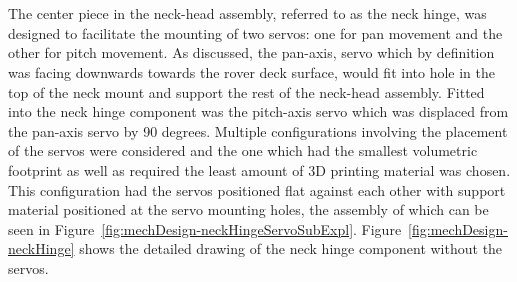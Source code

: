       \\\\
        The center piece in the neck-head assembly, referred to as the neck hinge, was designed to facilitate the mounting of two servos: one for pan movement and the other for pitch movement. As discussed, the pan-axis, servo which by definition was facing downwards towards the rover deck surface, would fit into hole in the top of the neck mount and support the rest of the neck-head assembly. Fitted into the neck hinge component was the pitch-axis servo which was displaced from the pan-axis servo by 90 degrees. Multiple configurations involving the placement of the servos were considered and the one which had the smallest volumetric footprint as well as required the least amount of 3D printing material was chosen. This configuration had the servos positioned flat against each other with support material positioned at the servo mounting holes, the assembly of which can be seen in Figure~\ref{fig:mechDesign-neckHingeServoSubExpl}. Figure~\ref{fig:mechDesign-neckHinge} shows the detailed drawing of the neck hinge component without the servos.
        
